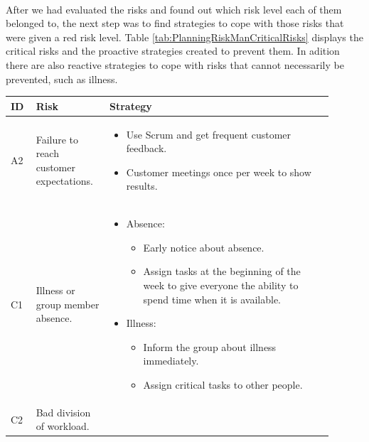 \paragraph{}After we had evaluated the risks and found out which risk level each of them belonged to, the next step was to find strategies to cope with those risks that were given a red risk level. Table \ref{tab:PlanningRiskManCriticalRisks} displays the critical risks and the proactive strategies created to prevent them. In adition there are also reactive strategies to cope with risks that cannot necessarily be prevented, such as illness.\\%
%
\clearpage
\begin{landscape}
\begin{table}[htbp]
\begin{tabular}{|p{0.07\linewidth}|p{0.20\linewidth}|p{0.63\linewidth}|}
    \hline
    \cellcolor{gray!25} \textbf{ID} & \cellcolor{gray!25} \textbf{Risk} & \cellcolor{gray!25} \textbf{Strategy} \\
    \hline
    A2 & Failure to reach customer expectations. & 
      \begin{itemize}
        \item Use Scrum and get frequent customer feedback.
        \item Customer meetings once per week to show results.
      \end{itemize} \\
    C1 & Illness or group member absence. &
      \begin{itemize}
        \item Absence:
          \begin{itemize}
            \item Early notice about absence.
            \item Assign tasks at the beginning of the week to give everyone the ability to spend time when it is available.
          \end{itemize}
        \item Illness:
          \begin{itemize}
            \item Inform the group about illness immediately.
            \item Assign critical tasks to other people.
          \end{itemize}
      \end{itemize} \\
    C2 & Bad division of workload. &

\end{tabular}
\end{table}
\end{landscape}
